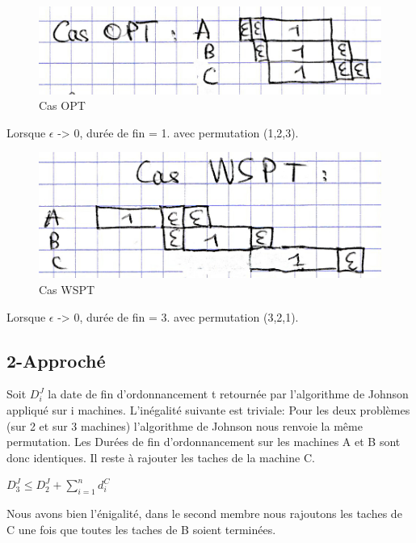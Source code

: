 \documentclass[12pt]{article}
\begin{document}
\begin{figure}[!ht]
\centering
\centerline{\includegraphics[scale=1]{1.jpg}}
\caption{Cas OPT}
\label{opt1}
\end{figure}

Lorsque $\epsilon$ -> 0, durée de fin = 1. avec permutation (1,2,3).

\begin{figure}[!ht]
\centering
\centerline{\includegraphics[scale=1]{2.jpg}}
\caption{Cas WSPT}
\label{wspt1}
\end{figure}

Lorsque $\epsilon$ -> 0, durée de fin = 3. avec permutation (3,2,1).

\subsection{2-Approché}

Soit $D_i^J$ la date de fin d'ordonnancement t retournée par l'algorithme de Johnson appliqué sur i machines.
L'inégalité suivante est triviale: Pour les deux problèmes (sur 2 et sur 3 machines) l'algorithme de Johnson nous renvoie la même permutation. Les Durées de fin d'ordonnancement sur les machines A et B sont donc identiques. Il reste à rajouter les taches de la machine C.   \\
\begin{center}
$D_3^J \le D_2^J + \displaystyle\sum_{i=1}^n d_i^C$\\
\end{center}
Nous avons bien l'énigalité, dans le second membre nous rajoutons les taches de C une fois que toutes les taches de B soient terminées.\\
\end{document}

